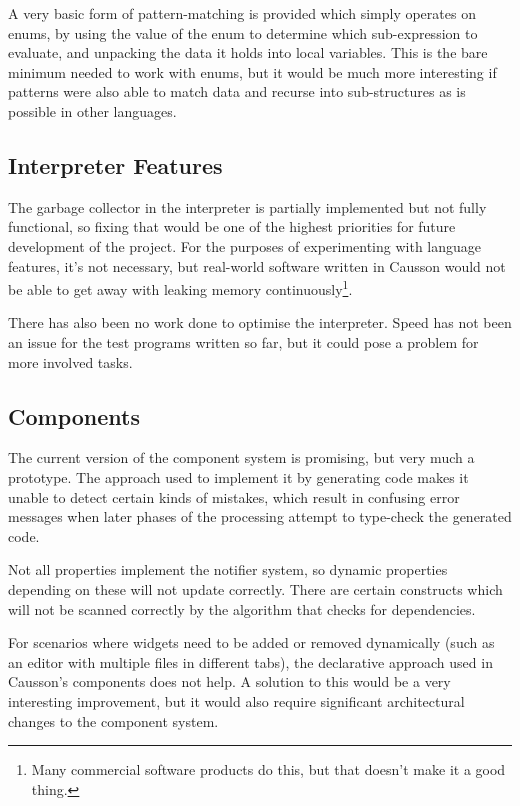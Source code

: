 \documentclass[11pt]{report}
\begin{document}
A very basic form of pattern-matching is provided which simply operates on enums, by using the value of the enum to determine which sub-expression to evaluate, and unpacking the data it holds into local variables. This is the bare minimum needed to work with enums, but it would be much more interesting if patterns were also able to match data and recurse into sub-structures as is possible in other languages.

\subsection{Interpreter Features}

The garbage collector in the interpreter is partially implemented but not fully functional, so fixing that would be one of the highest priorities for future development of the project. For the purposes of experimenting with language features, it's not necessary, but real-world software written in Causson would not be able to get away with leaking memory continuously\footnote{Many commercial software products do this, but that doesn't make it a good thing.}.

There has also been no work done to optimise the interpreter. Speed has not been an issue for the test programs written so far, but it could pose a problem for more involved tasks.

\subsection{Components}

The current version of the component system is promising, but very much a prototype. The approach used to implement it by generating code makes it unable to detect certain kinds of mistakes, which result in confusing error messages when later phases of the processing attempt to type-check the generated code.

Not all properties implement the notifier system, so dynamic properties depending on these will not update correctly. There are certain constructs which will not be scanned correctly by the algorithm that checks for dependencies.

For scenarios where widgets need to be added or removed dynamically (such as an editor with multiple files in different tabs), the declarative approach used in Causson's components does not help. A solution to this would be a very interesting improvement, but it would also require significant architectural changes to the component system.
\end{document}
